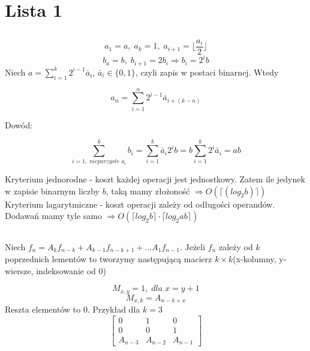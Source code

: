 \chapter{Lista 1}

\section{}
\section{}
\section{}
\section{}
\[a_1 = a, \; a_k = 1, \; a_{i+1} = \lfloor \frac{a_i}{2}\rfloor\]
\[b_a = b, \; b_{i+1} = 2b_i \Rightarrow b_i = 2^ib \] 
Niech $a = \sum_{i=1}^k 2^{i-1}\bar{a}_i$, $\bar{a}_i \in \{ 0,1\}$, czyli zapis w postaci binarnej. Wtedy

\[a_n = \sum_{i=1}^n 2^{i-1}\bar{a}_{i+(k-n)}\]

Dowód:

\[\sum_{i=1, \; nieparzyste \; a_i}^k b_i = \sum_{i=1}^k\bar{a}_i2^ib = b\sum_{i=1}^k2^i\bar{a}_i = ab\]

Kryterium jednorodne - koszt każdej operacji jest jednostkowy. Zatem ile jedynek w zapisie binarnym liczby $b$, taką mamy złożoność $\Rightarrow O(\lceil(log_2b)\rceil)$ \\
Kryterium lagarytmiczne - koszt operacji zależy od odługości operandów. Dodawań mamy tyle samo $\Rightarrow O(\lceil log_2b\rceil \cdot \lceil log_2 ab\rceil)$



\section{}

Niech $f_n = A_kf_{n-k} + A_{k-1}f_{n-k+1} + \ldots A_1f_{n-1}$. Jeżeli $f_n$ zależy od $k$ poprzednich lementów to tworzymy następującą macierz $k\times k$(x-kolumny, y-wiersze, indeksowanie od 0)

\[M_{x,y} = 1, \; dla \;x=y+1\]
\[M_{x,k} = A_{n- k + x}\]
Reszta elementów to 0. Przykład dla $k=3$
\[ 
 \left[
 	\begin{array}{ccc}
 	0		&	1		&	0\\
 	0		&	0		&	1\\
 	A_{n-3}	&	A_{n-2}	&	A_{n-1}
 	\end{array}
 \right]
\] 

